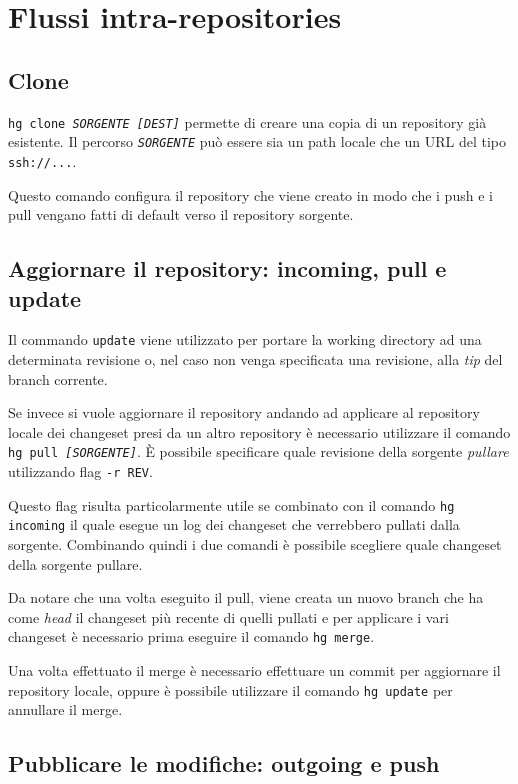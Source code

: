\section{Flussi intra-repositories}

\subsection{Clone}

\texttt{hg clone \textit{SORGENTE [DEST]}} permette di creare una copia di un repository già esistente. Il percorso \textit{\texttt{SORGENTE}} può essere sia un path locale che un URL del tipo \texttt{ssh://...}.

Questo comando configura il repository che viene creato in modo che i push e i pull vengano fatti di default verso il repository sorgente.

\subsection{Aggiornare il repository: incoming, pull e update}

Il commando \texttt{update} viene utilizzato per portare la working directory ad una determinata revisione o, nel caso non venga specificata una revisione, alla \textit{tip} del branch corrente.

Se invece si vuole aggiornare il repository andando ad applicare al repository locale dei changeset presi da un altro repository è necessario utilizzare il comando \texttt{hg pull \textit{[SORGENTE]}}. \`E possibile specificare quale revisione della sorgente \textit{pullare} utilizzando flag \texttt{-r REV}.

Questo flag risulta particolarmente utile se combinato con il comando \texttt{hg incoming} il quale esegue un log dei changeset che verrebbero pullati dalla sorgente.
Combinando quindi i due comandi è possibile scegliere quale changeset della sorgente pullare.

Da notare che una volta eseguito il pull, viene creata un nuovo branch che ha come \textit{head} il changeset più recente di quelli pullati e per applicare i vari changeset è necessario prima eseguire il comando \texttt{hg merge}.

Una volta effettuato il merge è necessario effettuare un commit per aggiornare il repository locale, oppure è possibile utilizzare il comando \texttt{hg update} per annullare il merge.

\subsection{Pubblicare le modifiche: outgoing e push}

